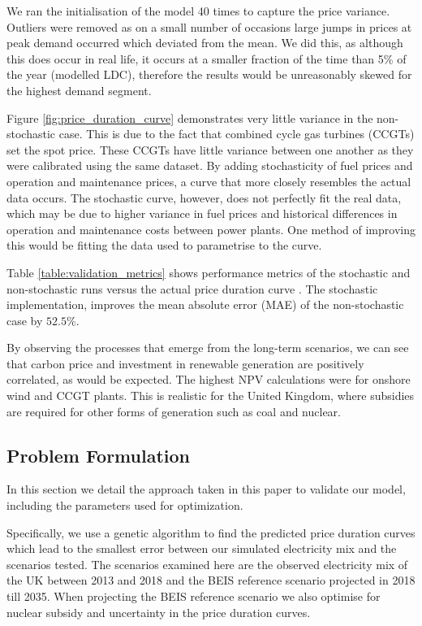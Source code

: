 We ran the initialisation of the model 40 times to capture the price variance. Outliers were removed as on a small number of occasions large jumps in prices at peak demand occurred which deviated from the mean. We did this, as although this does occur in real life, it occurs at a smaller fraction of the time than 5\% of the year (modelled LDC), therefore the results would be unreasonably skewed for the highest demand segment. 

Figure \ref{fig:price_duration_curve} demonstrates very little variance in the non-stochastic case. This is due to the fact that combined cycle gas turbines (CCGTs) set the spot price. These CCGTs have little variance between one another as they were calibrated using the same dataset. By adding stochasticity of fuel prices and operation and maintenance prices, a curve that more closely resembles the actual data occurs. The stochastic curve, however, does not perfectly fit the real data, which may be due to higher variance in fuel prices and historical differences in operation and maintenance costs between power plants. One method of improving this would be fitting the data used to parametrise to the curve.

Table \ref{table:validation_metrics} shows performance metrics of the stochastic and non-stochastic runs versus the actual price duration curve . The stochastic implementation, improves the mean absolute error (MAE) of the non-stochastic case by $52.5\%$.

By observing the processes that emerge from the long-term scenarios, we can see that carbon price and investment in renewable generation are positively correlated, as would be expected. The highest NPV calculations were for onshore wind and CCGT plants. This is realistic for the United Kingdom, where subsidies are required for other forms of generation such as coal and nuclear.





\subsection{Problem Formulation}


In this section we detail the approach taken in this paper to validate our model, including the parameters used for optimization. 

Specifically, we use a genetic algorithm to find the predicted price duration curves which lead to the smallest error between our simulated electricity mix and the scenarios tested. The scenarios examined here are the observed electricity mix of the UK between 2013 and 2018 and the BEIS reference scenario projected in 2018 till 2035. When projecting the BEIS reference scenario we also optimise for nuclear subsidy and uncertainty in the price duration curves.



